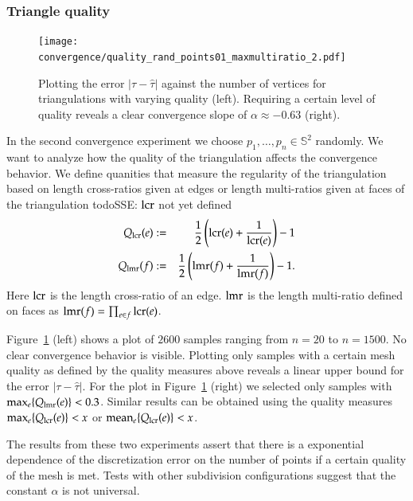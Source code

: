 \documentclass[Thesis]{subfiles}
\begin{document}
\subsubsection{Triangle quality}

\begin{figure}
\centering
\texttt{[image: convergence/quality\_rand\_points01\_maxmultiratio\_2.pdf]}
\caption{Plotting the error $|\tau - \hat\tau|$ against the number of vertices for triangulations with varying quality (left). Requiring a certain level of quality reveals a clear convergence slope of $\alpha\approx -0.63$ (right).}
\label{fig:convergence_quality}
\end{figure}

In the second convergence experiment we choose $p_1,\ldots,p_n\in \mathbb S^2$ randomly. We want to analyze how the quality of the triangulation affects the convergence behavior. We define quanities that measure the regularity of the triangulation based on length cross-ratios given at edges or length multi-ratios given at faces of the triangulation
todo{SSE: $\operatorname{lcr}$ not yet defined}
\begin{eqnarray*}
	Q_{\operatorname{lcr}}(e) &:=& \frac{1}{2}\left(\operatorname{lcr}(e) + \frac{1}{\operatorname{lcr}(e)}\right) - 1\label{eq:quality_lcr}\\
	Q_{\operatorname{lmr}}(f) &:=& \frac{1}{2}\left(\operatorname{lmr}(f) + \frac{1}{\operatorname{lmr}(f)}\right) - 1\label{eq:quality_lmr}.
\end{eqnarray*}
Here $\operatorname{lcr}$ is the length cross-ratio of an edge. $\operatorname{lmr}$ is the length multi-ratio defined on faces as $\operatorname{lmr}(f)=\prod_{e \in f}\operatorname{lcr}(e)$.

Figure~\ref{fig:convergence_quality} (left) shows a plot of $2600$ samples ranging from $n=20$ to $n=1500$. No clear convergence behavior is visible. Plotting only samples with a certain mesh quality as defined by the quality measures above reveals a linear upper bound for the error $|\tau-\hat \tau|$. For the plot in Figure~\ref{fig:convergence_quality} (right) we selected only samples with $\max_e \{Q_{\operatorname{lmr}}(e)\} < 0.3$. Similar results can be obtained using the quality measures $\max_e \{Q_{\operatorname{lcr}}(e)\} < x$ or $\operatorname{mean}_e \{Q_{\operatorname{lcr}}(e)\} < x$.

The results from these two experiments assert that there is a exponential dependence of the discretization error on the number of points if a certain quality of the mesh is met. Tests with other subdivision configurations suggest that the constant $\alpha$ is not universal.
\end{document}
